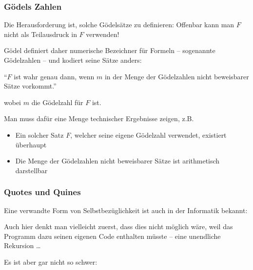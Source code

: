 \documentclass[aspectratio=1610,onlymath]{beamer}
\begin{document}
\begin{frame}\frametitle{Gödels Zahlen}

\smallskip

Die Herausforderung ist, solche Gödelsätze zu definieren:
Offenbar kann man $F$ nicht als Teilausdruck in $F$ verwenden!
\bigskip\pause

Gödel definiert daher numerische Bezeichner für Formeln -- sogenannte Gödelzahlen -- und kodiert seine Sätze anders:
\begin{center}\alert{"`$F$ ist wahr genau dann, wenn $m$ in der Menge der Gödelzahlen nicht beweisbarer Sätze vorkommt."'} \end{center}
wobei $m$ die Gödelzahl für $F$ ist.\medskip

Man muss dafür eine Menge technischer Ergebnisse zeigen, z.B.
\begin{itemize}
\item Ein solcher Satz $F$, welcher seine eigene Gödelzahl verwendet, existiert überhaupt
\item Die Menge der Gödelzahlen nicht beweisbarer Sätze ist arithmetisch darstellbar
\end{itemize}

\end{frame}


\begin{frame}\frametitle{Quotes und Quines}

Eine verwandte Form von Selbstbezüglichkeit ist auch in der Informatik bekannt:\medskip


Auch hier denkt man vielleicht zuerst, dass dies nicht möglich wäre, weil das Programm dazu seinen eigenen Code enthalten müsste -- eine unendliche Rekursion \ldots\medskip
\pause

Es ist aber gar nicht so schwer:
\bigskip
{}

\end{frame}

\end{document}
